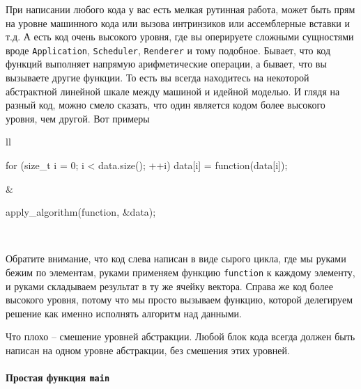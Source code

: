 При написании любого кода у вас есть мелкая рутинная работа, может быть прям на уровне машинного кода или вызова интринзиков или ассемблерные вставки и т.д.
А есть код очень высокого уровня, где вы оперируете сложными сущностями вроде \verb"Application", \verb"Scheduler", \verb"Renderer" и тому подобное.
Бывает, что код функций выполняет напрямую арифметические операции, а бывает, что вы вызываете другие функции.
То есть вы всегда находитесь на некоторой абстрактной линейной шкале между машиной и идейной моделью.
И глядя на разный код, можно смело сказать, что один является кодом более высокого уровня, чем другой.
Вот примеры
\begin{center}
\begin{tabular}{ll}
{
\begin{minipage}[\baselineskip]{8cm}
\begin{cppcode}[numbers = none]
for (size_t i = 0; i < data.size(); ++i) {
  data[i] = function(data[i]);
}
\end{cppcode}
\end{minipage}
}&{
\begin{minipage}[\baselineskip]{8cm}
\begin{cppcode}[numbers = none]

apply_algorithm(function, &data);

\end{cppcode}
\end{minipage}
}\\
\end{tabular}
\end{center}
Обратите внимание, что код слева написан в виде сырого цикла, где мы руками бежим по элементам, руками применяем функцию \verb"function" к каждому элементу, и руками складываем результат в ту же ячейку вектора.
Справа же код более высокого уровня, потому что мы просто вызываем функцию, которой делегируем решение как именно исполнять алгоритм над данными.

Что плохо -- смешение уровней абстракции.
Любой блок кода всегда должен быть написан на одном уровне абстракции, без смешения этих уровней.

\paragraph{Простая функция \texttt{main}}

